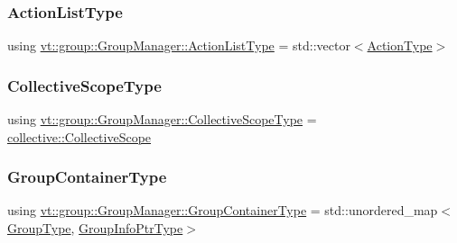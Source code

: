 \subsubsection{\texorpdfstring{Action\+List\+Type}{ActionListType}}
{\footnotesize\ttfamily using \hyperlink{structvt_1_1group_1_1_group_manager_a48b2dd05bbdda19c5d6195b8932a2716}{vt\+::group\+::\+Group\+Manager\+::\+Action\+List\+Type} =  std\+::vector$<$\hyperlink{namespacevt_ae0a5a7b18cc99d7b732cb4d44f46b0f3}{Action\+Type}$>$}

\mbox{\label{structvt_1_1group_1_1_group_manager_a376be92b957fb33ac9b855f6d134ca6a}} 
\subsubsection{\texorpdfstring{Collective\+Scope\+Type}{CollectiveScopeType}}
{\footnotesize\ttfamily using \hyperlink{structvt_1_1group_1_1_group_manager_a376be92b957fb33ac9b855f6d134ca6a}{vt\+::group\+::\+Group\+Manager\+::\+Collective\+Scope\+Type} =  \hyperlink{structvt_1_1collective_1_1_collective_scope}{collective\+::\+Collective\+Scope}}

\mbox{\label{structvt_1_1group_1_1_group_manager_a9e2a0989865f4097bb5edd390865555e}} 
\subsubsection{\texorpdfstring{Group\+Container\+Type}{GroupContainerType}}
{\footnotesize\ttfamily using \hyperlink{structvt_1_1group_1_1_group_manager_a9e2a0989865f4097bb5edd390865555e}{vt\+::group\+::\+Group\+Manager\+::\+Group\+Container\+Type} =  std\+::unordered\+\_\+map$<$\hyperlink{namespacevt_a27b5e4411c9b6140c49100e050e2f743}{Group\+Type}, \hyperlink{structvt_1_1group_1_1_group_manager_adedebd6e550efd2bee5bb118f816b2e0}{Group\+Info\+Ptr\+Type}$>$}

\mbox{\label{structvt_1_1group_1_1_group_manager_adedebd6e550efd2bee5bb118f816b2e0}} 
